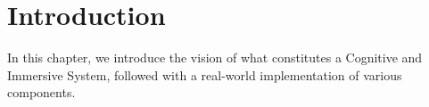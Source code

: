 \section{Introduction}

In this chapter, we introduce the vision of what constitutes a Cognitive and
Immersive System, followed with a real-world implementation of various
components.
